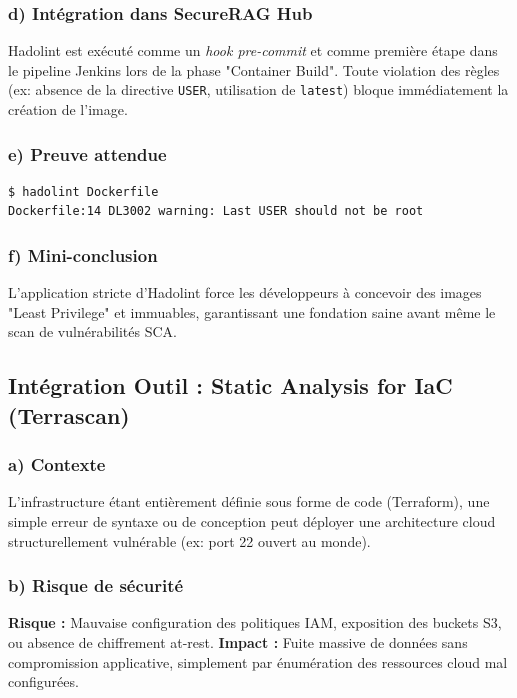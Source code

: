 \subsubsection{d) Intégration dans SecureRAG Hub}
Hadolint est exécuté comme un \textit{hook pre-commit} et comme première étape dans le pipeline Jenkins lors de la phase "Container Build". Toute violation des règles (ex: absence de la directive \texttt{USER}, utilisation de \texttt{latest}) bloque immédiatement la création de l'image.

\subsubsection{e) Preuve attendue}
\begin{lstlisting}[language=bash, caption={Vérification du Dockerfile par Hadolint}, label={lst:hadolint_proof}]
$ hadolint Dockerfile
Dockerfile:14 DL3002 warning: Last USER should not be root
\end{lstlisting}

\subsubsection{f) Mini-conclusion}
L'application stricte d'Hadolint force les développeurs à concevoir des images "Least Privilege" et immuables, garantissant une fondation saine avant même le scan de vulnérabilités SCA.

\subsection{Intégration Outil : Static Analysis for IaC (Terrascan)}

\subsubsection{a) Contexte}
L'infrastructure étant entièrement définie sous forme de code (Terraform), une simple erreur de syntaxe ou de conception peut déployer une architecture cloud structurellement vulnérable (ex: port 22 ouvert au monde).

\subsubsection{b) Risque de sécurité}
\textbf{Risque :} Mauvaise configuration des politiques IAM, exposition des buckets S3, ou absence de chiffrement at-rest.
\textbf{Impact :} Fuite massive de données sans compromission applicative, simplement par énumération des ressources cloud mal configurées.

